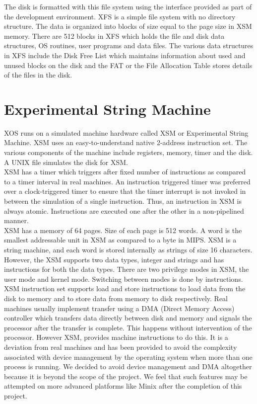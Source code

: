 \documentclass[10pt]{report}
\begin{document}
The disk is formatted with this file system using the interface provided as part of the development environment. XFS is a simple file system with no directory structure. The data is organized into blocks of size equal to the page size in XSM memory. There are 512 blocks in XFS which holds the file and disk data structures, OS routines, user programs and data files. The various data structures in XFS include the Disk Free List which maintains information about used and unused blocks on the disk and the FAT or the File Allocation Table stores details of the files in the disk.



\section{Experimental String Machine }
XOS runs on a simulated machine hardware called XSM or Experimental String Machine. XSM uses an easy-to-understand native 2-address instruction set. The various components of the machine include registers, memory, timer and the disk. A UNIX file simulates the disk for XSM.\\

XSM has a timer which triggers after fixed number of instructions as compared to a timer interval in real machines. An instruction triggered timer was preferred over a clock-triggered timer to ensure that the timer interrupt is not invoked in between the simulation of a single instruction. Thus, an instruction in XSM is always atomic. Instructions are executed one after the other in a non-pipelined manner.\\

XSM has a memory of 64 pages. Size of each page is 512 words. A word is the smallest addressable unit in XSM as compared to a byte in MIPS. XSM is a string machine, and each word is stored internally as strings of size 16 characters.  However, the XSM supports two data types, integer and strings and has instructions for both  the data types. There are two privilege modes in XSM, the user mode and kernel mode. Switching between modes is done by instructions.\\

XSM instruction set supports load and store instructions to load data from the disk to memory and to store data from memory to disk respectively. Real machines usually implement transfer using a DMA (Direct Memory Access) controller which transfers data directly between disk and memory and signals the processor after the transfer is complete. This happens without intervention of the processor. However XSM, provides machine instructions to do this. It is a deviation from real machines and has been provided to avoid the complexity associated with device management by the operating system when more than one process is running. We decided to avoid device management and DMA altogether because it is beyond the scope of the project. We feel that such features may be attempted on more advanced platforms like Minix after the completion of this project. \\
\end{document}
